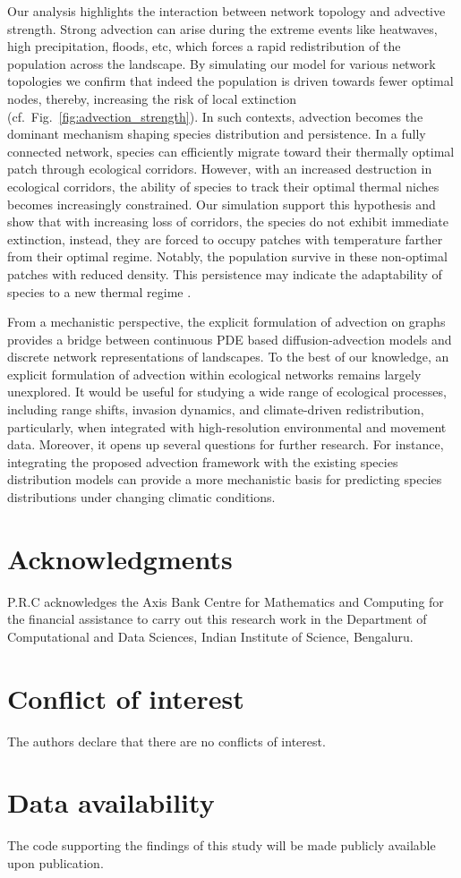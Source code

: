 \documentclass[12pt]{article}
\begin{document}
Our analysis highlights the interaction between network topology and advective strength. Strong advection can arise during the extreme events like heatwaves, high precipitation, floods, etc, which forces a rapid redistribution of the population across the landscape. By simulating our model for various network topologies we confirm that indeed the population is driven towards fewer optimal nodes, thereby, increasing the risk of local extinction (cf.~Fig.~\ref{fig:advection_strength}). In such contexts, advection becomes the dominant mechanism shaping species distribution and persistence. In a fully connected network, species can efficiently migrate toward their thermally optimal patch through ecological corridors. However, with an increased destruction in ecological corridors, the ability of species to track their optimal thermal niches becomes increasingly constrained. Our simulation support this hypothesis and show that with increasing loss of corridors, the species do not exhibit immediate extinction, instead, they are forced to occupy patches with temperature farther from their optimal regime. Notably, the population survive in these non-optimal patches with reduced density. This persistence may indicate the adaptability of species to a new thermal regime \cite{bennett2019integrating}.    

From a mechanistic perspective, the explicit formulation of advection on graphs provides a bridge between continuous PDE based diffusion-advection models and discrete network representations of landscapes. To the best of our knowledge, an explicit formulation of advection within ecological networks remains largely unexplored.  It would be useful for  studying a wide range of ecological processes, including range shifts, invasion dynamics, and climate-driven redistribution, particularly, when integrated with high-resolution environmental and movement data. Moreover, it opens up several questions for further research. For instance, integrating the proposed advection framework with the existing species distribution models can provide a more mechanistic basis for predicting species distributions under changing climatic conditions.


\section*{Acknowledgments}
P.R.C acknowledges the Axis Bank Centre for Mathematics and Computing for the financial assistance to carry out this research work in the Department of Computational and Data Sciences, Indian Institute of Science, Bengaluru.


\section*{Conflict of interest}
The authors declare that there are no conflicts of interest.

\section*{Data availability}
The code supporting the findings of this study will be made publicly available upon publication. 




\end{document}

